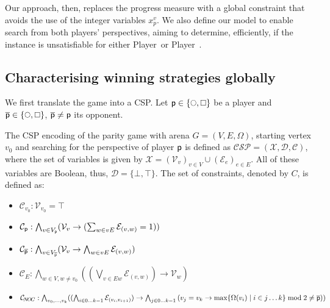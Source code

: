 \documentclass[letterpaper]{article} %
\begin{document}
Our approach, then, replaces the progress measure with a global constraint that avoids the use of the integer variables $x_p^v$. We also define our model to enable search from both players’ perspectives, aiming to determine, efficiently, if the instance is unsatisfiable for either Player~\even or Player~\odd.

\subsection{Characterising winning strategies globally}

We first translate the game into a CSP.
%
Let \( \player \in \{ \even, \odd \} \) be a player and \( \opponent \in \{ \even, \odd \} \), \( \opponent \neq \player \) its opponent. %

\begin{definition}\label{def:csp}
    The CSP encoding of the parity game with arena $G=(V,E,\Omega)$, starting vertex $v_0$ and searching for the perspective of player $\player$ is defined as $\mathcal{CSP = (X, D, C)}$, where the set of variables is given by $\mathcal{X} = (\mathcal{V}_v)_{v \in V} \cup (\mathcal{E}_e)_{e \in E}$. All of these variables are Boolean, thus, $\mathcal{D} = \{\bot,\top\}$. The set of constraints, denoted by $C$, is defined as:
    \begin{itemize}
        \item $\mathcal{C}_{v_0} : \mathcal{V}_{v_0} = \top$
        \item $\mathcal{C}_{\player} : \bigwedge_{v \in V_{\player}} (\mathcal{V}_v \rightarrow (\sum_{w \in vE} \mathcal{E}_{(v,w)}= 1))$
        \item $\mathcal{C}_{\opponent} : \bigwedge_{v \in V_{\opponent}} (\mathcal{V}_v \rightarrow \bigwedge_{w \in vE} \mathcal{E}_{(v,w)})$
        \item $\mathcal{C}_{\!E} : \bigwedge_{w \in V, w \neq v_0} ((\bigvee_{v \in Ew} \mathcal{E}_{(v,w)}) \rightarrow \mathcal{V}_w)$
        \item $\mathcal{C}_{\!N\!O\!C} : \bigwedge_{v_0, \dots, v_k} ((\bigwedge_{i\in 0\dots k-1} \mathcal{E}_{(v_i,v_{i+1})}) \rightarrow \bigwedge_{j\in 0\dots k-1}\\ (v_j=v_k \rightarrow \max\{\Omega(v_i) \mid i\in j\dots k\} \bmod 2 \ne \opponent))$
    \end{itemize}
\end{definition}
\end{document}
